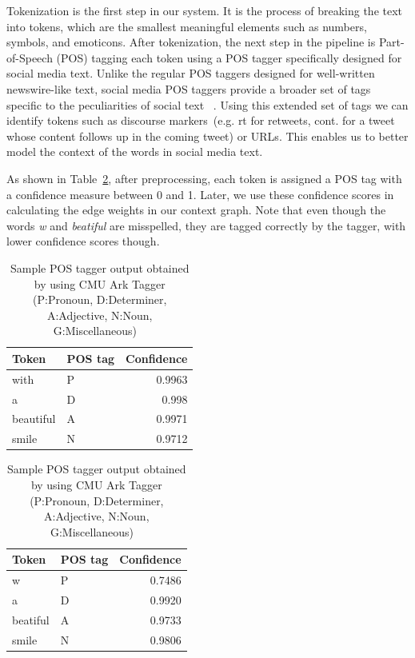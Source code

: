 \documentclass[preprint,review,12pt]{elsarticle}
\begin{document}
Tokenization is the first step in our system. It is the process of breaking the text into tokens, which are the smallest meaningful elements such as numbers, symbols, and emoticons. After tokenization, the next step in the pipeline is Part-of-Speech (POS) tagging each token using a POS tagger specifically designed for social media text. Unlike the regular POS taggers designed for well-written newswire-like text, social media POS taggers provide a broader set of tags specific to the peculiarities of social text ~\cite{DBLP:conf/naacl/OwoputiODGSS13,Gimpel:2011:PTT:2002736.2002747}. Using this extended set of tags we can identify tokens such as discourse markers~(e.g. rt for retweets, cont. for a tweet whose content follows up in the coming tweet) or URLs. This enables us to better model the context of the words in social media text.

As shown in Table~\ref{tab:postags}, after preprocessing, each token is assigned a POS tag with a confidence measure between 0 and 1. Later, we use these confidence scores in calculating the edge weights in our context graph. Note that even though the words \emph{w} and\emph{ beatiful} are misspelled, they are tagged correctly by the tagger, with lower confidence scores though.

\begin{table}[htbp]
\begin{minipage}{.5\linewidth}
\begin{tabular}[h]{|llr|}
 \hline
Token & POS tag & Confidence \\
 \hline
with & P & 0.9963 \\
 \hline
a & D & 0.998 \\
 \hline
beautiful & A & 0.9971 \\
 \hline
smile & N & 0.9712 \\
 \hline
\end{tabular}
\end{minipage}
\begin{minipage}{.5\linewidth}
\begin{tabular}[h]{|llr|}
 \hline
Token & POS tag & Confidence \\
 \hline
w & P & 0.7486 \\
 \hline
a & D & 0.9920 \\
 \hline
beatiful & A & 0.9733 \\
 \hline
smile & N & 0.9806 \\
 \hline
\end{tabular}
\end{minipage}
\caption{Sample POS tagger output obtained by using CMU Ark Tagger (P:Pronoun, D:Determiner, A:Adjective, N:Noun, G:Miscellaneous) ~\cite{DBLP:conf/naacl/OwoputiODGSS13,Gimpel:2011:PTT:2002736.2002747}}
\label{tab:postags}
\end{table}
\end{document}
